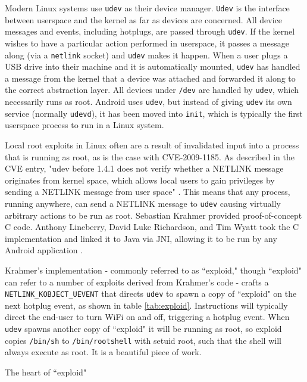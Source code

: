 Modern Linux systems use \texttt{udev} as their device manager.  \texttt{Udev} is the interface between userspace and the kernel as
far as devices are concerned.  All device messages and events, including hotplugs, are passed through \texttt{udev}.  If the kernel
wishes to have a particular action performed in userspace, it passes a message along (via a \texttt{netlink} socket) and
\texttt{udev} makes it happen.  When a user plugs a USB drive into their machine and it is automatically mounted, \texttt{udev} has
handled a message from the kernel that a device was attached and forwarded it along to the correct abstraction layer.  All devices
under \texttt{/dev} are handled by \texttt{udev}, which necessarily runs as root.  Android uses \texttt{udev}, but instead
of giving \texttt{udev} its own service (normally \texttt{udevd}), it has been moved into \texttt{init}, which is typically the
first userspace process to run in a Linux system.

Local root exploits in Linux often are a result of invalidated input into a process that is running as root, as is the case with
CVE-2009-1185.  As described in the CVE entry, "udev before 1.4.1 does not verify whether a NETLINK message originates from kernel
space, which allows local users to gain privileges by sending a NETLINK message from user space" \cite{udevcve}.  This means that
any process, running anywhere, can send a NETLINK message to \texttt{udev} causing virtually arbitrary actions to be run as root.
Sebastian Krahmer provided proof-of-concept C code.  Anthony Lineberry, David Luke Richardson, and Tim Wyatt took the C
implementation and linked it to Java via JNI, allowing it to be run by any Android application \cite{arentpermissions}.

Krahmer's implementation - commonly referred to as ``exploid," though ``exploid" can refer to a number of exploits derived from
Krahmer's code - crafts a \texttt{NETLINK\_KOBJECT\_UEVENT} that directs \texttt{udev} to spawn a copy of ``exploid" on the next
hotplug event, as shown in table \ref{tab:exploid}.  Instructions will typically direct the end-user to turn WiFi on and off,
triggering a hotplug event.  When \texttt{udev} spawns another copy of ``exploid" it will be running as root, so exploid copies
\texttt{/bin/sh} to \texttt{/bin/rootshell} with setuid root, such that the shell will always execute as root.  It is a beautiful
piece of work.

\begin{table}[htpb]

\caption{The heart of ``exploid"}
\label{tab:exploid}
\end{table}

